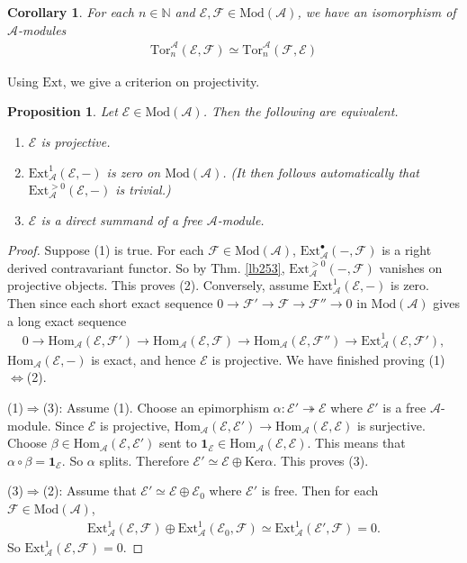 \documentclass[12pt,b5paper,notitlepage]{report}
\theoremstyle{definition}
\theoremstyle{plain}
\newtheorem{pp}[df]{Proposition}
\newtheorem{co}[df]{Corollary}
\newcommand{\mc}{\mathcal}
\newcommand{\id}{\mathbf{1}}
\newcommand{\Hom}{\mathrm{Hom}}
\newcommand{\blt}{\bullet}
\newcommand{\Nbb}{\mathbb N}
\newcommand{\Ker}{\mathrm{Ker}}
\newcommand{\Ext}{\mathrm{Ext}}
\newcommand{\Tor}{\mathrm{Tor}}
\newcommand{\Mod}{\mathrm{Mod}}
\numberwithin{equation}{section}
\begin{document}
\begin{co}
For each $n\in\Nbb$ and $\mc E,\mc F\in\Mod(\mc A)$, we have an isomorphism of $\mc A$-modules
\begin{align*}
\Tor_n^{\mc A}(\mc E,\mc F)\simeq\Tor_n^{\mc A}(\mc F,\mc E)
\end{align*}
\end{co}

Using $\Ext$, we give a criterion on projectivity.

\begin{pp}\label{lb282}
Let $\mc E\in\Mod(\mc A)$. Then the following are equivalent.
\begin{enumerate}[label=(\arabic*)]
\item $\mc E$ is projective.
\item $\Ext^1_{\mc A}(\mc E,-)$ is zero on $\Mod(\mc A)$. (It then follows automatically that $\Ext^{>0}_{\mc A}(\mc E,-)$ is trivial.)
\item $\mc E$ is a direct summand of a free $\mc A$-module.
\end{enumerate} 
\end{pp}

\begin{proof}
Suppose (1) is true. For each $\mc F\in\Mod(\mc A)$, $\Ext_{\mc A}^\blt(-,\mc F)$ is a right derived  contravariant functor. So by Thm. \ref{lb253}, $\Ext_{\mc A}^{>0}(-,\mc F)$ vanishes on projective objects. This proves (2). Conversely, assume $\Ext_{\mc A}^1(\mc E,-)$ is zero. Then since each short exact sequence $0\rightarrow\mc F'\rightarrow\mc F\rightarrow\mc F''\rightarrow0$ in $\Mod(\mc A)$ gives a long exact sequence
\begin{align*}
0\rightarrow \Hom_{\mc A}(\mc E,\mc F')\rightarrow \Hom_{\mc A}(\mc E,\mc F)\rightarrow \Hom_{\mc A}(\mc E,\mc F'')\rightarrow \Ext_{\mc A}^1(\mc E,\mc F'),
\end{align*}
$\Hom_{\mc A}(\mc E,-)$ is exact, and hence $\mc E$ is projective. We have finished proving (1)$\Leftrightarrow$(2).

(1)$\Rightarrow$(3): Assume (1). Choose an epimorphism $\alpha:\mc E'\twoheadrightarrow\mc E$ where $\mc E'$ is a free $\mc A$-module. Since $\mc E$ is projective, $\Hom_{\mc A}(\mc E,\mc E')\rightarrow\Hom_{\mc A}(\mc E,\mc E)$ is surjective. Choose $\beta\in\Hom_{\mc A}(\mc E,\mc E')$ sent to $\id_{\mc E}\in\Hom_{\mc A}(\mc E,\mc E)$. This means that $\alpha\circ\beta=\id_{\mc E}$. So $\alpha$ splits. Therefore $\mc E'\simeq\mc E\oplus\Ker\alpha$. This proves (3).

(3)$\Rightarrow$(2): Assume that $\mc E'\simeq\mc E\oplus\mc E_0$ where $\mc E'$ is free. Then for each $\mc F\in\Mod(\mc A)$,
\begin{align*}
\Ext_{\mc A}^1(\mc E,\mc F)\oplus\Ext_{\mc A}^1(\mc E_0,\mc F)\simeq\Ext_{\mc A}^1(\mc E',\mc F)=0.
\end{align*}
So $\Ext_{\mc A}^1(\mc E,\mc F)=0$.
\end{proof}
\end{document}
